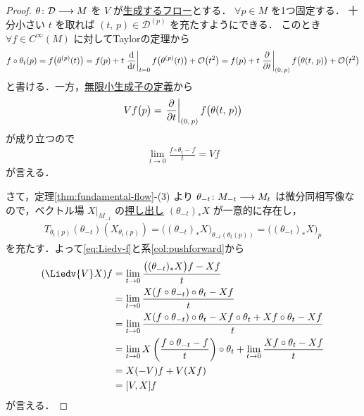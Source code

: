 \documentclass[geometry_main]{subfiles}
\begin{document}
\begin{proof}
    $\theta \colon \mathcal{D} \longrightarrow M$ を $V$ が\hyperref[thm:fundamental-flow]{生成するフロー}とする．
    $\forall p \in M$ を1つ固定する．
    十分小さい $t$ を取れば $(t,\, p) \in \mathcal{D}^{(p)}$ を充たすようにできる．
    このとき $\forall f \in C^\infty (M)$ に対してTaylorの定理から
    \begin{align}
        f \circ \theta_t (p) = f \bigl( \theta^{(p)}(t) \bigr) = f(p) + t \eval{\dv{}{t}}_{t=0} f \bigl( \theta^{(p)}(t) \bigr) + \order{t^2} = f(p) + t \eval{\pdv{}{t}}_{(0,\, p)} f \bigl( \theta(t,\, p) \bigr) + \order{t^2}
    \end{align}
    と書ける．一方，\hyperref[prop:infinitesimal-generator-local]{無限小生成子の定義}から
    \begin{align}
        Vf \bigl( p \bigr) = \eval{\pdv{}{t}}_{(0,\, p)} f \bigl( \theta(t,\, p) \bigr) 
    \end{align}
    が成り立つので
    \begin{align}
        \label{eq:Liedv-f}
        \lim_{t\to 0} \frac{f \circ \theta_t - f}{t} = Vf
    \end{align}
    が言える．
    
    さて，定理\ref{thm:fundamental-flow}-(3) より $\theta_{-t} \colon M_{-t} \longrightarrow M_t$ は微分同相写像なので，ベクトル場 $X|_{M_{-t}}$ の\hyperref[prop:diffeo-Frelated]{押し出し} $(\theta_{-t})_* X$ が一意的に存在し，
    \begin{align}
        T_{\theta_t(p)} (\theta_{-t})(X_{\theta_t (p)}) = \bigl((\theta_{-t})_* X\bigr)_{\theta_{-t} (\theta_t(p))} = \bigl((\theta_{-t})_* X\bigr)_{p}
    \end{align}
    を充たす．よって\eqref{eq:Liedv-f}と系\ref{col:pushforward}から
    \begin{align}
        (\Liedv{V} X) f
        &= \lim_{t\to 0} \frac{\bigl((\theta_{-t})_* X\bigr)f - Xf}{t} \\
        &= \lim_{t\to 0} \frac{X (f \circ \theta_{-t}) \circ \theta_t - Xf}{t} \\
        &= \lim_{t\to 0} \frac{X (f \circ \theta_{-t}) \circ \theta_t - Xf \circ \theta_t + Xf \circ \theta_t - Xf}{t} \\
        &= \lim_{t\to 0} X\left(\frac{f \circ \theta_{-t} - f}{t}\right) \circ \theta_{t}+ \lim_{t \to 0} \frac{Xf \circ \theta_t - Xf}{t} \\
        &= X (-V) f + V(Xf) \\
        &= \comm{V}{X}f
    \end{align}
    が言える．
\end{proof}
\end{document}
